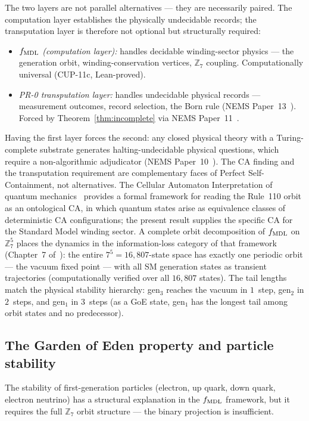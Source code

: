 \documentclass[11pt]{article}
\theoremstyle{remark}
\begin{document}
The two layers are not parallel alternatives --- they are necessarily paired. The
computation layer establishes the physically undecidable records; the transputation layer
is therefore not optional but structurally required:
\begin{itemize}
\item \emph{$f_{\rm MDL}$ (computation layer):} handles decidable winding-sector
  physics --- the generation orbit, winding-conservation vertices, $\mathbb{Z}_7$
  coupling. Computationally universal (CUP-11c, Lean-proved).
\item \emph{PR-0 transputation layer:} handles undecidable physical records ---
  measurement outcomes, record selection, the Born rule (NEMS Paper~13~\cite{SpivackUGP2024}). Forced by
  Theorem~\ref{thm:incomplete} via NEMS Paper~11~\cite{SpivackUGP2024}.
\end{itemize}
Having the first layer forces the second: any closed physical theory with a Turing-complete
substrate generates halting-undecidable physical questions, which require a non-algorithmic
adjudicator (NEMS Paper~10~\cite{SpivackUGP2024}). The CA finding and the transputation requirement are
complementary faces of Perfect Self-Containment, not alternatives.
The Cellular Automaton Interpretation of quantum mechanics~\cite{tHooft2016CA} provides
a formal framework for reading the Rule~110 orbit as an ontological CA, in which quantum
states arise as equivalence classes of deterministic CA configurations; the present result
supplies the specific CA for the Standard Model winding sector.
A complete orbit decomposition of $f_{\rm MDL}$ on $\mathbb{Z}_7^5$ places the dynamics
in the information-loss category of that framework (Chapter~7 of~\cite{tHooft2016CA}):
the entire $7^5 = 16{,}807$-state space has exactly one periodic orbit --- the vacuum
fixed point --- with all SM generation states as transient trajectories
(computationally verified over all $16{,}807$ states).
The tail lengths match the physical stability hierarchy: gen$_3$ reaches the vacuum
in $1$~step, gen$_2$ in $2$~steps, and gen$_1$ in $3$~steps (as a GoE state, gen$_1$
has the longest tail among orbit states and no predecessor).

\subsection{The Garden of Eden property and particle stability}

The stability of first-generation particles (electron, up quark, down quark, electron
neutrino) has a structural explanation in the $f_{\rm MDL}$ framework, but it requires
the full $\mathbb{Z}_7$ orbit structure --- the binary projection is insufficient.
\end{document}
